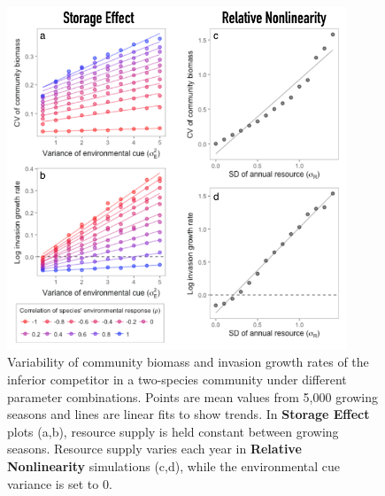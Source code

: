 \documentclass[11pt,]{article}
\begin{document}
\begin{figure}[!ht]
  \centering
      \includegraphics[width=4in]{./components/SI_invasion_factorials.png}
  \caption{Variability of community biomass and invasion growth rates of the inferior competitor in a two-species community under different parameter combinations. Points are mean values from 5,000 growing seasons and lines are linear fits to show trends. In \textbf{Storage Effect} plots (a,b), resource supply is held constant between growing seasons. Resource supply varies each year in \textbf{Relative Nonlinearity} simulations (c,d), while the environmental cue variance is set to 0.}
\end{figure}

\newpage{}
\end{document}
